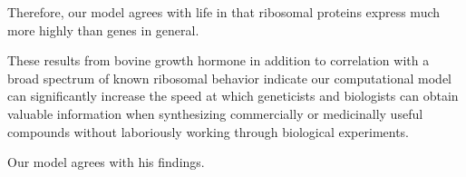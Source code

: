 \documentclass[12pt, draft]{article}
\numberwithin{equation}{section}
\begin{document}
Therefore, our model agrees with life in that ribosomal proteins
express much more highly than genes in general.

These results from bovine growth hormone in addition to correlation with a broad
spectrum of known ribosomal behavior indicate our computational model
can significantly increase the speed at which geneticists and
biologists can obtain valuable information when synthesizing
commercially or medicinally useful compounds without laboriously
working through biological experiments.

Our model agrees with his findings.

{}
\begin{singlespace}
  
\end{singlespace}
\end{document}
